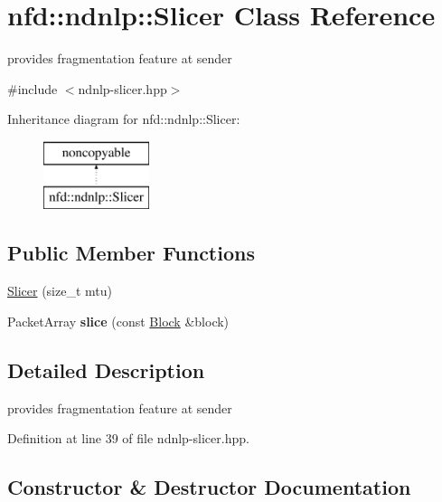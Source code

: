\hypertarget{classnfd_1_1ndnlp_1_1Slicer}{}\section{nfd\+:\+:ndnlp\+:\+:Slicer Class Reference}
\label{classnfd_1_1ndnlp_1_1Slicer}


provides fragmentation feature at sender  




{\ttfamily \#include $<$ndnlp-\/slicer.\+hpp$>$}

Inheritance diagram for nfd\+:\+:ndnlp\+:\+:Slicer\+:\begin{figure}[H]
\begin{center}
\leavevmode
\includegraphics[height=2.000000cm]{classnfd_1_1ndnlp_1_1Slicer}
\end{center}
\end{figure}
\subsection*{Public Member Functions}
\begin{DoxyCompactItemize}
\item 
\hyperlink{classnfd_1_1ndnlp_1_1Slicer_abf4fe06ac66296231229244430236143}{Slicer} (size\+\_\+t mtu)
\item 
Packet\+Array {\bfseries slice} (const \hyperlink{classndn_1_1Block}{Block} \&block)\hypertarget{classnfd_1_1ndnlp_1_1Slicer_aebacd9d2d5e13ca29266d6a66567d735}{}\label{classnfd_1_1ndnlp_1_1Slicer_aebacd9d2d5e13ca29266d6a66567d735}

\end{DoxyCompactItemize}


\subsection{Detailed Description}
provides fragmentation feature at sender 

Definition at line 39 of file ndnlp-\/slicer.\+hpp.



\subsection{Constructor \& Destructor Documentation}
